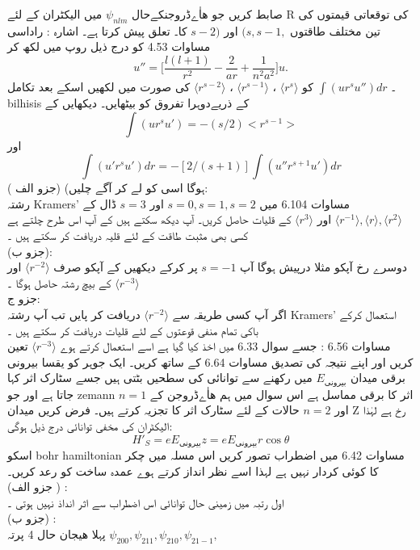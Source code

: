 صابط کریں جو ھاٰےڈروجنکےحال 
\(\psi_{nlm}\)
میں الیکٹران کے لئے R کی توقعاتی قیمتوں کی تین مختلف طاقتوں
\((s,s-1,\)
اور
\(s-2)\)
کا۔ تعلق پیش کرتا ہے۔ اشارہ : راداسی مساوات 4.53 کو درج ذیل روپ میں لکھ کر
\[u''=\big[\frac{l(l+1)}{r^{2}}-\frac{2}{ar}+\frac{1}{n^{2}a^{2}}\big]u.\]
۔
\(\int(ur^{s}u'')dr\)	 
کو 
\(\langle r^{s}\rangle\)
،
\(\langle r^{s-1}\rangle\)
،
\(\langle r^{s-2}\rangle \)
کی  صورت میں لکھیں اسکے بعد تکامل
bilhisis
کے ذریےدوہرا تفروق کو بیٹھایں۔ دیکھایں کے\\
\[\int(ur^{s}u')=-(s/2)<r^{s-1}>\]
اور
\[\int(u'r^{s}u')dr=-[2/(s+1)]\int(u''r^{s+1}u')dr\]
ہوگا اسی کو لے کر آگے چلیں)
 
(جزو الف ):\\
 رشتہ Kramers' مساوات 6.104 میں
\(s=0,s=1,s=2\)
اور 
\(s=3\)
ڈال کے 
\(\langle r^{-1}\rangle,\langle r\rangle,\langle r^{2}\rangle\)
اور 
\(\langle r^{3}\rangle\)
کے قلیات حاصل کریں۔ آپ دیکھ سکتے ہیں کے آپ اس طرح چلتے ہے کسی بھی مثبت طاقت کے لئے قلیہ دریافت کر سکتے ہیں ۔\\
(جزو ب):\\ 
دوسرے رخ آپکو مثلا درپیش  ہوگا آپ 
\(s=-1\)
پر کرکے دیکھیں کے آپکو صرف 
\(\langle r^{-2}\rangle\)
اور 
\(\langle r^{-3}\rangle\)
کے بیچ رشتہ حاصل ہوگا ۔\\
جزو ج:\\
 اگر آپ کسی طریقہ سے
\(\langle r^{-2}\rangle\)
دریافت کر پایں تب آپ رشتہ Kramers' استعمال کرکے باکی تمام منفی قوعتوں کے لئے قلیات دریافت کر سکتے ہیں ۔\\
مساوات 6.56 : جسے سوال 6.33 میں اخذ کیا گیا ہے اسے استعمال کرتے ہوے 
\(\langle r^{-3}\rangle\)
تعین کریں اور اپنے نتیجہ کی تصدیق مساوات 6.64 کے ساتھ کریں۔
ایک جوہر کو يقسا بیرونی برقی میدان
\(E_{\text{بیرونی}}\)
میں رکھنے سے توانائی کی سطحیں بٹتی ہیں جسے سٹارک اثر کہا جاتا ہے اور جو zemann اثر کا برقی مماسل ہے اس سوال میں ہم ھاٰےڈروجن کے 
\(n=1\)
اور 
\(n=2\)
حالات کے لئے سٹارک اثر کا تجزیہ کرتے ہیں۔ فرض کریں میدان
Z
رخ ہے لہٰذا الیکٹران کی مخفی توانائی درج ذیل ہوگی: 
\[H'_{S}=eE_{\text{بیرونی}}z=eE_{\text{بیرونی}}r\cos{\theta}\]
اسکو bohr hamiltonian  مساوات 6.42 میں اضطراب تصور کریں اس مسلہ میں چکر کا کوئی کردار نہیں ہے لہذا اسے نظر انداز کرتے ہوے عمدہ ساخت کو رعد کریں۔\\
(جزو الف ) :\\
 اول رتبہ میں زمینی حال توانائی اس اضطراب سے اثر انداذ نہیں ہوتی ۔\\
(جزو ب) :\\  
پہلا هیجان حال
4
پرتہ
\(\psi_{200},\psi_{211},\psi_{210},\psi_{21-1},\)
